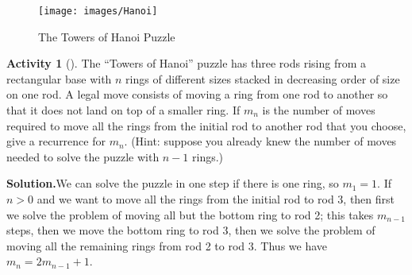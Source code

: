 \documentclass[10pt,]{book}
\theoremstyle{plain}
\theoremstyle{definition}
\newtheorem{activity}[project]{Activity}
\numberwithin{equation}{chapter}
\begin{document}
\begin{figure}
\centering
\texttt{[image: images/Hanoi]}
\caption{The Towers of Hanoi Puzzle\label{Hanoi}}
\end{figure}
\begin{activity}[]\label{HanoiProblem}
The ``Towers of Hanoi'' puzzle has three rods rising from a rectangular base with \(n\) rings of different sizes stacked in decreasing order of size on one rod. A legal move consists of moving a ring from one rod to another so that it does not land on top of a smaller ring. If \(m_n\) is the number of moves required to move all the rings from the initial rod to another rod that you choose, give a recurrence for \(m_n\). (Hint: suppose you already knew the number of moves needed to solve the puzzle with \(n-1\) rings.)%
\par\medskip\noindent%
\textbf{Solution.}\quad We can solve the puzzle in one step if there is one ring, so \(m_1=1\). If \(n>0\) and we want to move all the rings from the initial rod to rod 3, then first we solve the problem of moving all but the bottom ring to rod 2; this takes \(m_{n-1}\) steps, then we move the bottom ring to rod 3, then we solve the problem of moving all the remaining rings from rod 2 to rod 3. Thus we have \(m_n=2m_{n-1}+1\).%
\end{activity}
\end{document}
